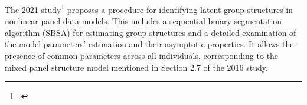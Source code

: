 \documentclass[UTF8,a4paper,10pt]{article}
\begin{document}
The 2021 study\footcite{Wang2021} proposes a procedure for identifying latent group structures in nonlinear panel data models. This includes a sequential binary segmentation algorithm (SBSA) for estimating group structures and a detailed examination of the model parameters' estimation and their asymptotic properties​​. It allows the presence of common parameters across all individuals, corresponding to the mixed
panel structure model mentioned in Section 2.7 of the 2016 study. 













\end{document}
